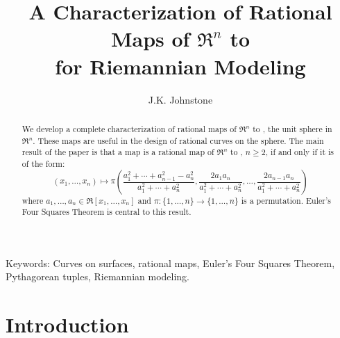 \newif\ifFull
\Fullfalse

\SingleSpace

\setlength{\oddsidemargin}{0pt}
\setlength{\headsep}{3em}
\setlength{\textheight}{8.75in}
\setlength{\textwidth}{6.5in}
\setlength{\columnsep}{5mm}		%

\pagestyle{myheadings}


\title{A Characterization of Rational Maps of $\Re^n$ to \\for Riemannian Modeling}
\author{J.K. Johnstone}


\maketitle

\begin{abstract}
We develop a complete characterization of rational
maps of $\Re^n$ to , the unit sphere in $\Re^n$.
These maps are useful in the design of rational curves on the sphere.
The main result of the paper is that
a map is a rational map of $\Re^n$ to , $n \geq 2$, if and only if
it is of the form:
\[
	(x_1,\ldots,x_n) \mapsto 
	\pi (\frac{a_1^2 + \cdots + a_{n-1}^2 - a_n^2}{a_1^2 + \cdots + a_n^2},
	 \frac{2a_1a_n}{a_1^2 + \cdots + a_n^2},
	 \ldots,
	 \frac{2a_{n-1}a_n}{a_1^2 + \cdots + a_n^2})
\]
where $a_1,\ldots,a_n \in \Re[x_1,\ldots,x_n]$
and $\pi: \{1,\ldots,n\} \rightarrow \{1,\ldots,n\}$ is a permutation.
Euler's Four Squares Theorem is central to this result.
\end{abstract}

\vspace{1in}

\noindent Keywords: 
Curves on surfaces, rational maps, 
Euler's Four Squares Theorem, Pythagorean tuples, Riemannian modeling.

\clearpage

\section{Introduction}

